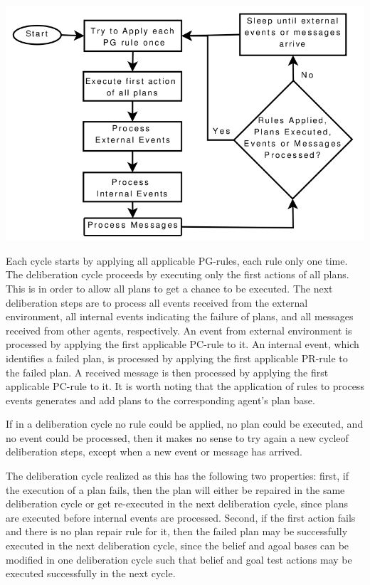 \documentclass[a4paper]{article}
\begin{document}
\begin{center}
\includegraphics[keepaspectratio,scale=0.3]{fig/rcycle.png}
\end{center}
 
Each cycle starts by applying all applicable PG-rules, each rule only one time. The deliberation cycle proceeds by executing only the first actions of all plans. This is in order to allow all plans to get a chance to be executed. The next deliberation steps are to
process all events received from the external environment, all internal events indicating the failure of plans, and all messages received from other agents, respectively. An event from external environment is processed by applying the first applicable PC-rule to it. An internal event, which identifies a failed plan, is processed by applying the first applicable PR-rule to the failed plan. A received message is then processed by applying the first applicable PC-rule to it. It is worth noting that the application of rules
to process events generates and add plans to the corresponding agent’s plan base.

If in a deliberation cycle no rule could be applied, no plan could be executed, and no event could be processed, then it makes no sense to try again a new cycleof deliberation steps, except when a new event or message has arrived.

The deliberation cycle realized as this has the following two properties: first, if the execution of a plan fails, then the plan will either be repaired in the same deliberation cycle or get re-executed in the next deliberation cycle, since plans are executed before internal events are processed. Second, if the first action fails and there is no plan repair rule for it, then the failed plan may be successfully executed in the next deliberation cycle, since the belief and agoal bases can be modified in one deliberation cycle such that belief and goal test actions may be executed successfully in the next cycle.
\end{document}
